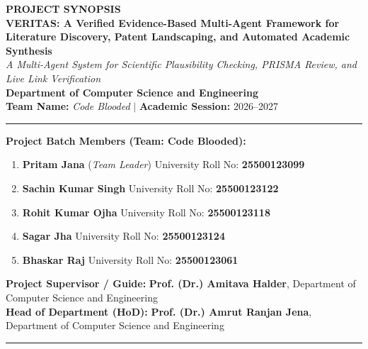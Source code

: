 \documentclass[11pt,a4paper]{article}
\begin{document}
\begin{center}
    {\LARGE \textbf{\color{primaryblue} PROJECT SYNOPSIS}}\\[0.4em]
    {\Large \textbf{VERITAS: A Verified Evidence-Based Multi-Agent Framework for Literature Discovery, Patent Landscaping, and Automated Academic Synthesis}}\\[0.3em]
    {\normalsize \textit{A Multi-Agent System for Scientific Plausibility Checking, PRISMA Review, and Live Link Verification}}\\[0.8em]

    \textbf{Department of Computer Science and Engineering}\\[0.2em]
    \textbf{Team Name:} \textit{Code Blooded} \quad $\vert$ \quad \textbf{Academic Session:} 2026--2027\\[0.3em]
    \hrule
\end{center}

\vspace{0.2em}
\noindent
\textbf{Project Batch Members (Team: Code Blooded):}
\begin{enumerate}[leftmargin=1.8em,noitemsep]
    \item \textbf{Pritam Jana} (\textit{Team Leader}) \hfill University Roll No: \textbf{25500123099}
    \item \textbf{Sachin Kumar Singh} \hfill University Roll No: \textbf{25500123122}
    \item \textbf{Rohit Kumar Ojha} \hfill University Roll No: \textbf{25500123118}
    \item \textbf{Sagar Jha} \hfill University Roll No: \textbf{25500123124}
    \item \textbf{Bhaskar Raj} \hfill University Roll No: \textbf{25500123061}
\end{enumerate}

\vspace{0.3em}
\noindent
\textbf{Project Supervisor / Guide:} \textbf{Prof. (Dr.) Amitava Halder}, Department of Computer Science and Engineering\\[0.2em]
\textbf{Head of Department (HoD):} \textbf{Prof. (Dr.) Amrut Ranjan Jena}, Department of Computer Science and Engineering

\vspace{0.3em}
\hrule
\vspace{0.5em}
\end{document}
